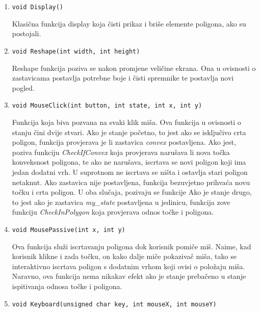 \documentclass[utf8]{fer}
\begin{document}
\begin{enumerate}
\item \begin{lstlisting}
void Display()
\end{lstlisting}
Klasična funkcija display koja čisti prikaz i briše elemente poligona, ako su postojali.

\item \begin{lstlisting}
void Reshape(int width, int height)
\end{lstlisting}

Reshape funkcija poziva se nakon promjene veličine ekrana. Ona u ovisnosti o zastavicama postavlja potrebne boje i čisti spremnike te postavlja novi pogled.

\item \begin{lstlisting}
void MouseClick(int button, int state, int x, int y)
\end{lstlisting}

Funkcija koja biva pozvana na svaki klik miša. Ova funkcija u ovisnosti o stanju čini dvije stvari. Ako je stanje početno, to jest ako se isključivo crta poligon, funkcija provjerava je li zastavica \textit{convex} postavljena. Ako jest, poziva funkciju \textit{CheckIfConvex} koja provjerava narušava li nova točka konveksnost poligona, te ako ne narušava, iscrtava se novi poligon koji ima jedan dodatni vrh. U suprotnom ne iscrtava se ništa i ostavlja stari poligon netaknut. Ako zastavica nije postavljena, funkcija bezuvjetno prihvaća novu točku i crta poligon. U oba slučaja, pozivaju se funkcije  Ako je stanje drugo, to jest ako je zastavica \textit{my\_state} postavljena u jedinicu, funkcija zove funkciju \textit{CheckInPolygon} koja provjerava odnos točke i poligona.

\item \begin{lstlisting}
void MousePassive(int x, int y)
\end{lstlisting}

Ova funkcija služi iscrtavanju poligona dok korisnik pomiče miš. Naime, kad korisnik klikne i zada točku, on kako dalje miče pokazivač miša, tako se interaktivno iscrtava poligon s dodatnim vrhom koji ovisi o položaju miša. Naravno, ova funkcija nema nikakav efekt ako je stanje prebačeno u stanje ispitivanja odnosa točke i poligona.

\item \begin{lstlisting}
void Keyboard(unsigned char key, int mouseX, int mouseY)
\end{lstlisting}


\end{enumerate}
\end{document}
